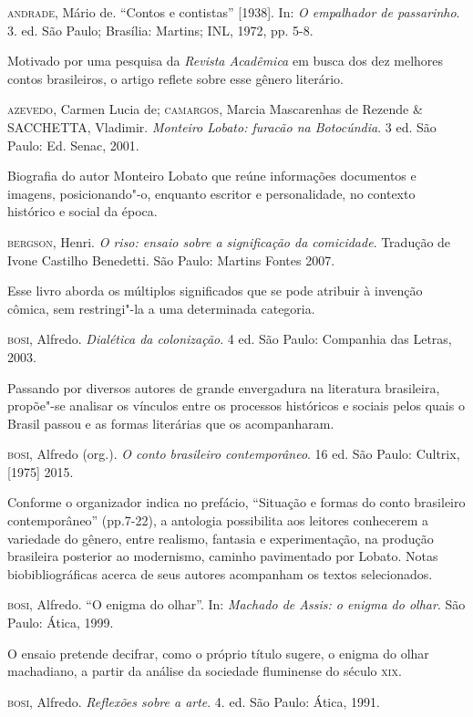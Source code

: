 \documentclass[11pt]{extarticle}
\begin{document}
\textsc{andrade}, Mário de. ``Contos e contistas'' {[}1938{]}. In: \emph{O
empalhador de passarinho}. 3. ed. São Paulo; Brasília: Martins; INL,
1972, pp. 5-8. 

Motivado por uma pesquisa da \emph{Revista Acadêmica} em
busca dos dez melhores contos brasileiros, o artigo reflete sobre esse
gênero literário.

\textsc{azevedo}, Carmen Lucia de; \textsc{camargos}, Marcia Mascarenhas de Rezende \&
SACCHETTA, Vladimir. \emph{Monteiro Lobato: furacão na Botocúndia}. 3
ed. São Paulo: Ed. Senac, 2001.

Biografia do autor Monteiro Lobato que reúne informações documentos e imagens, 
posicionando"-o, enquanto escritor e personalidade, no contexto histórico e 
social da época. 

\textsc{bergson}, Henri. \emph{O riso: ensaio sobre a significação da
comicidade}. Tradução de Ivone Castilho Benedetti. São Paulo: Martins
Fontes 2007.

Esse livro aborda os múltiplos significados que se pode atribuir à invenção cômica, 
sem restringi"-la a uma determinada categoria. 

\textsc{bosi}, Alfredo. \emph{Dialética da colonização}. 4 ed. São Paulo:
Companhia das Letras, 2003.

Passando por diversos autores de grande envergadura na literatura brasileira, 
propõe"-se analisar os vínculos entre os processos históricos e sociais pelos 
quais o Brasil passou e as formas literárias que os acompanharam. 

\textsc{bosi}, Alfredo (org.). \emph{O conto brasileiro contemporâneo}. 16 ed.
São Paulo: Cultrix, {[}1975{]} 2015. 

Conforme o organizador indica no prefácio, ``Situação e formas do conto brasileiro 
contemporâneo'' (pp.7-22), a antologia possibilita aos leitores conhecerem a 
variedade do gênero, entre realismo, fantasia e experimentação, na produção
brasileira posterior ao modernismo, caminho pavimentado por Lobato.
Notas biobibliográficas acerca de seus autores acompanham os textos
selecionados.

\textsc{bosi}, Alfredo. ``O enigma do olhar''. In: \emph{Machado de Assis: o
enigma do olhar}. São Paulo: Ática, 1999.

O ensaio pretende decifrar, como o próprio título sugere, o enigma do olhar machadiano, 
a partir da análise da sociedade fluminense do século \textsc{xix}.

\textsc{bosi}, Alfredo. \emph{Reflexões sobre a arte}. 4. ed. São Paulo: Ática,
1991. 
\end{document}
